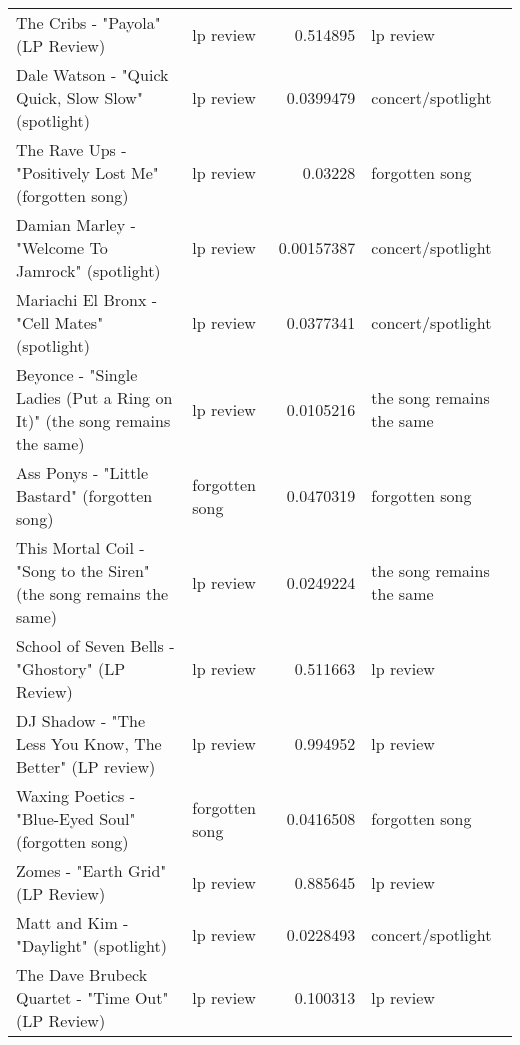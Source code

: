 \documentclass[letterpaper,10pt]{article}
\begin{document}
\begin{table}[H]
\begin{adjustbox}{max width=\linewidth}
\begin{tabular}{llrl}
 The Cribs - "Payola" (LP Review)                                                 & lp review                 &  0.514895    & lp review                 \\
 Dale Watson - "Quick Quick, Slow Slow" (spotlight)                               & lp review                 &  0.0399479   & concert/spotlight         \\
 The Rave Ups - "Positively Lost Me" (forgotten song)                             & lp review                 &  0.03228     & forgotten song            \\
 Damian Marley - "Welcome To Jamrock" (spotlight)                                 & lp review                 &  0.00157387  & concert/spotlight         \\
 Mariachi El Bronx - "Cell Mates" (spotlight)                                     & lp review                 &  0.0377341   & concert/spotlight         \\
 Beyonce - "Single Ladies (Put a Ring on It)" (the song remains the same)         & lp review                 &  0.0105216   & the song remains the same \\
 Ass Ponys - "Little Bastard" (forgotten song)                                    & forgotten song            &  0.0470319   & forgotten song            \\
 This Mortal Coil - "Song to the Siren" (the song remains the same)               & lp review                 &  0.0249224   & the song remains the same \\
 School of Seven Bells - "Ghostory" (LP Review)                                   & lp review                 &  0.511663    & lp review                 \\
 DJ Shadow - "The Less You Know, The Better" (LP review)                          & lp review                 &  0.994952    & lp review                 \\
 Waxing Poetics - "Blue-Eyed Soul" (forgotten song)                               & forgotten song            &  0.0416508   & forgotten song            \\
 Zomes - "Earth Grid" (LP Review)                                                 & lp review                 &  0.885645    & lp review                 \\
 Matt and Kim - "Daylight" (spotlight)                                            & lp review                 &  0.0228493   & concert/spotlight         \\
 The Dave Brubeck Quartet - "Time Out" (LP Review)                                & lp review                 &  0.100313    & lp review                 \\

\end{tabular}
\end{adjustbox}
\end{table}
\end{document}
